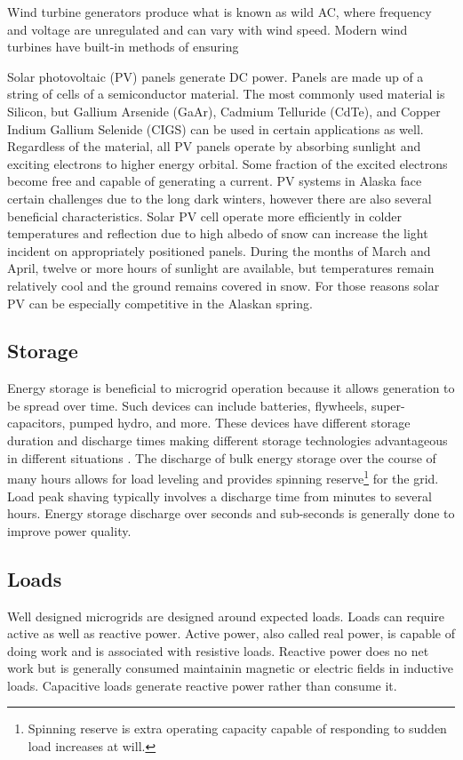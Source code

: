 Wind turbine generators produce what is known as wild AC, where frequency and voltage are unregulated and can vary with wind speed. Modern wind turbines have built-in methods of ensuring

Solar photovoltaic (PV) panels generate DC power. Panels are made up of a string of cells of a semiconductor material. The most commonly used material is Silicon, but Gallium Arsenide (GaAr), Cadmium Telluride (CdTe), and Copper Indium Gallium Selenide (CIGS) can be used in certain applications as well. Regardless of the material, all PV panels operate by absorbing sunlight and exciting electrons to higher energy orbital. Some fraction of the excited electrons become free and capable of generating a current. PV systems in Alaska face certain challenges due to the long dark winters, however there are also several beneficial characteristics. Solar PV cell operate more efficiently in colder temperatures and reflection due to high albedo of snow can increase the light incident on appropriately positioned panels. During the months of March and April, twelve or more hours of sunlight are available, but temperatures remain relatively cool and the ground remains covered in snow. For those reasons solar PV can be especially competitive in the Alaskan spring.

\subsection{Storage}
Energy storage is beneficial to microgrid operation because it allows generation to be spread over time. Such devices can include batteries, flywheels, super-capacitors, pumped hydro, and more. These devices have different storage duration and discharge times making different storage technologies advantageous in different situations \cite{Schoenung2003}. The discharge of bulk energy storage over the course of many hours allows for load leveling and provides spinning reserve\footnote{Spinning reserve is extra operating capacity capable of responding to sudden load increases at will.} for the grid. Load peak shaving typically involves a discharge time from minutes to several hours. Energy storage discharge over seconds and sub-seconds is generally done to improve power quality.

\subsection{Loads}
Well designed microgrids are designed around expected loads. Loads can require active as well as reactive power. Active power, also called real power, is capable of doing work and is associated with resistive loads. Reactive power does no net work but is generally consumed maintainin magnetic or electric fields in inductive loads. Capacitive loads generate reactive power rather than consume it.


